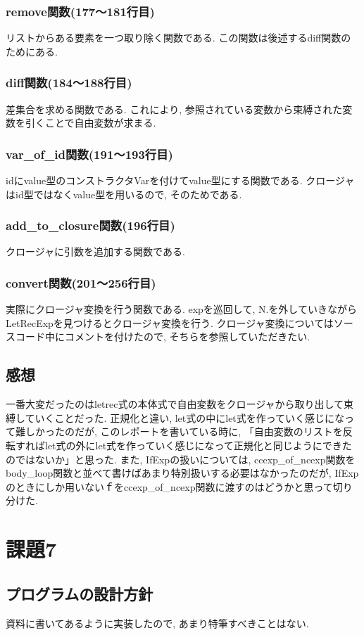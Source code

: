 \documentclass{jarticle}
\begin{document}
\subsubsection{remove関数(177〜181行目)}
リストからある要素を一つ取り除く関数である. この関数は後述するdiff関数のためにある. 
\subsubsection{diff関数(184〜188行目)}
差集合を求める関数である. これにより, 参照されている変数から束縛された変数を引くことで自由変数が求まる. 
\subsubsection{var\_of\_id関数(191〜193行目)}
idにvalue型のコンストラクタVarを付けてvalue型にする関数である. クロージャはid型ではなくvalue型を用いるので, そのためである.
\subsubsection{add\_to\_closure関数(196行目)}
クロージャに引数を追加する関数である.
\subsubsection{convert関数(201〜256行目)}
実際にクロージャ変換を行う関数である. expを巡回して, N.を外していきながらLetRecExpを見つけるとクロージャ変換を行う. クロージャ変換についてはソースコード中にコメントを付けたので, そちらを参照していただきたい.
\subsection{感想}
一番大変だったのはletrec式の本体式で自由変数をクロージャから取り出して束縛していくことだった. 正規化と違い, let式の中にlet式を作っていく感じになって難しかったのだが, このレポートを書いている時に, 「自由変数のリストを反転すればlet式の外にlet式を作っていく感じになって正規化と同じようにできたのではないか」と思った. また, IfExpの扱いについては, ccexp\_of\_ncexp関数をbody\_loop関数と並べて書けばあまり特別扱いする必要はなかったのだが, IfExpのときにしか用いないｆをccexp\_of\_ncexp関数に渡すのはどうかと思って切り分けた.

\section{課題7}
\subsection{プログラムの設計方針}
資料に書いてあるように実装したので, あまり特筆すべきことはない.
\end{document}

